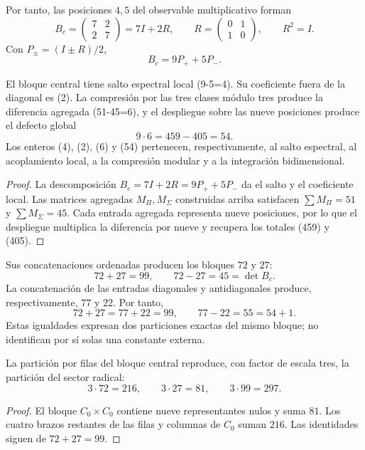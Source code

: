 Por tanto, las posiciones \(4,5\) del observable multiplicativo forman
\[
B_c=
\begin{pmatrix}7&2\\2&7\end{pmatrix}
=7I+2R,
\qquad
R=\begin{pmatrix}0&1\\1&0\end{pmatrix},
\qquad R^2=I.
\]
Con \(P_\pm=(I\pm R)/2\),
\[
B_c=9P_++5P_-.
\]
\begin{theorem}
\label{thm:app-jerarquia-cuatro-dos-seis-cincuentaycuatro}
El bloque central tiene salto espectral local (9-5=4). Su coeficiente
fuera de la diagonal es (2). La compresión por las tres clases módulo tres
produce la diferencia agregada (51-45=6), y el despliegue sobre las nueve
posiciones produce el defecto global
\[
 9\cdot6=459-405=54.
\]
Los enteros (4), (2), (6) y (54) pertenecen, respectivamente, al
salto espectral, al acoplamiento local, a la compresión modular y a la
integración bidimensional.
\end{theorem}

\begin{proof}
La descomposición \(B_c=7I+2R=9P_++5P_-\) da el salto y el
coeficiente local. Las matrices agregadas \(M_\Pi,M_\Sigma\) construidas
arriba satisfacen
\(\sum M_\Pi=51\) y \(\sum M_\Sigma=45\). Cada entrada agregada representa
nueve posiciones, por lo que el despliegue multiplica la diferencia por
nueve y recupera los totales (459) y (405).
\end{proof}
Sus concatenaciones ordenadas producen los bloques \(72\) y \(27\):
\[
72+27=99,
\qquad
72-27=45=\det B_c.
\]
La concatenación de las entradas diagonales y antidiagonales produce,
respectivamente, \(77\) y \(22\). Por tanto,
\[
 72+27=77+22=99,\qquad
 77-22=55=54+1.
\]
Estas igualdades expresan dos particiones exactas del mismo bloque; no
identifican por sí solas una constante externa.

\begin{proposition}
\label{prop:app-local-global-radical}
La partición por filas del bloque central reproduce, con factor de escala
tres, la partición del sector radical:
\[
 3\cdot72=216,\qquad
 3\cdot27=81,\qquad
 3\cdot99=297.
\]
\end{proposition}

\begin{proof}
El bloque \(C_0\times C_0\) contiene nueve representantes nulos y suma
\(81\). Los cuatro brazos restantes de las filas y columnas de \(C_0\)
suman \(216\). Las identidades siguen de \(72+27=99\).
\end{proof}

